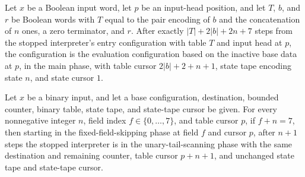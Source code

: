 \begin{lemma}
\label{Turing.timedCut_Interpreter_initialize}
\leanok
{}
Let $x$ be a Boolean input word, let $p$ be an input-head position, and let $T$, $b$,
and $r$ be Boolean words with $T$ equal to the pair encoding of $b$ and the
concatenation of $n$ ones, a zero terminator, and $r$. After exactly $|T|+2|b|+2n+7$
steps from the stopped interpreter's entry configuration with table $T$ and input head
at $p$, the configuration is the evaluation configuration based on the inactive base
data at $p$, in the main phase, with table cursor $2|b|+2+n+1$, state tape encoding
state $n$, and state cursor $1$.
\end{lemma}

\begin{lemma}
\label{Turing.timedCut_skip_fixed}
\leanok
{}
Let $x$ be a binary input, and let a base configuration, destination, bounded counter,
binary table, state tape, and state-tape cursor be given. For every nonnegative integer
$n$, field index $f\in\{0,\ldots,7\}$, and table cursor $p$, if $f+n=7$, then starting
in the fixed-field-skipping phase at field $f$ and cursor $p$, after $n+1$ steps the
stopped interpreter is in the unary-tail-scanning phase with the same destination and
remaining counter, table cursor $p+n+1$, and unchanged state tape and state-tape cursor.
\end{lemma}

